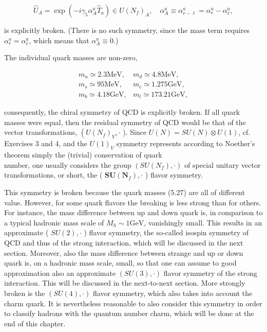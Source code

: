 \documentclass[10pt, letterpaper]{article}
\begin{document}
$$
\hat{U}_{A}=\exp \left(-i \gamma_{5} \alpha_{A}^{a} \hat{T}_{a}\right) \in U\left(N_{f}\right)_{A}, \quad \alpha_{A}^{a} \equiv \alpha_{r-\ell}^{a}=\alpha_{r}^{a}-\alpha_{\ell}^{a},
$$

is explicitly broken. (There is no such symmetry, since the mass term requires $\alpha_{r}^{a}=\alpha_{\ell}^{a}$, which means that $\alpha_{A}^{a} \equiv 0$.)

The individual quark masses are non-zero,

$$
\begin{array}{ll}
m_{u} \simeq 2.3 \mathrm{MeV}, & m_{d} \simeq 4.8 \mathrm{MeV}, \\
m_{s} \simeq 95 \mathrm{MeV}, & m_{c} \simeq 1.275 \mathrm{GeV}, \\
m_{b} \simeq 4.18 \mathrm{GeV}, & m_{t} \simeq 173.21 \mathrm{GeV},
\end{array}
$$

consequently, the chiral symmetry of QCD is explicitly broken. If all quark masses were equal, then the residual symmetry of QCD would be that of the vector transformations, $\left(U\left(N_{f}\right)_{V}, \cdot\right.$ ). Since $U(N)=S U(N) \otimes U(1)$, cf. Exercises 3 and 4, and the $U(1)_{V}$ symmetry represents according to Noether's theorem simply the (trivial) conservation of quark\\
number, one usually considers the group $\left(S U\left(N_{f}\right), \cdot\right)$ of special unitary vector transformations, or short, the ( $\boldsymbol{S U}\left(\boldsymbol{N}_{f}\right), \cdot$ ) flavor symmetry.

This symmetry is broken because the quark masses (5.27) are all of different value. However, for some quark flavors the breaking is less strong than for others. For instance, the mass difference between up and down quark is, in comparison to a typical hadronic mass scale of $M_{h} \sim 1 \mathrm{GeV}$, vanishingly small. This results in an approximate ( $S U(2), \cdot$ ) flavor symmetry, the so-called isospin symmetry of QCD and thus of the strong interaction, which will be discussed in the next section. Moreover, also the mass difference between strange and up or down quark is, on a hadronic mass scale, small, so that one can assume to good approximation also an approximate $(S U(3), \cdot)$ flavor symmetry of the strong interaction. This will be discussed in the next-to-next section. More strongly broken is the $(S U(4), \cdot)$ flavor symmetry, which also takes into account the charm quark. It is nevertheless reasonable to also consider this symmetry in order to classify hadrons with the quantum number charm, which will be done at the end of this chapter.
\end{document}
